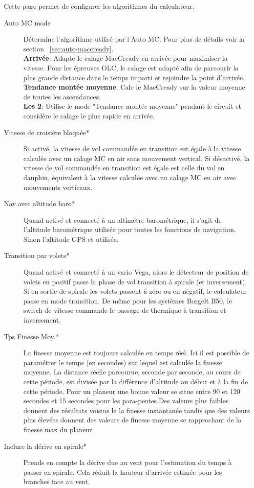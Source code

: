 Cette page permet de configurer les algorithmes du calculateur.

\begin{description}
\item[Auto MC mode]  Détermine l'algorithme utilisé par l'Auto MC. Pour plus de détails voir la section ~\ref{sec:auto-maccready}. \\  
  {\bf Arrivée}: Adapte le calage MacCready en arrivée pour maximiser la vitesse. Pour les épreuves OLC, le calage est adapté afin de parcourir la plus grande distance dans le temps imparti et rejoindre la point d'arrivée.\\
  {\bf Tendance montée moyenne}: Cale le MacCready sur la valeur moyenne de toutes les ascendances.\\
  {\bf Les 2}: Utilise le mode "Tendance montée moyenne" pendant le circuit et considère le calage le plus rapide en arrivée.
\item[Vitesse de croisière bloquée*]  Si activé, la vitesse de vol commandée en transition est égale à la vitesse calculée avec un calage MC en air sans mouvement vertical. Si désactivé, la vitesse de vol commandée en transition est égale est celle du vol en dauphin, équivalent à la vitesse calculée avec un calage MC en air avec mouvements verticaux.
\item[Nav.avec altitude baro*]  Quand activé et connecté à un altimètre barométrique, il s'agit de l'altitude barométrique utilisée pour toutes les fonctions de navigation. Sinon l'altitude GPS et utilisée.
\item[Transition par volets*]
Quand activé et connecté à un vario Vega, alors le détecteur de position de volets en positif passe la phase de vol transition à spirale (et inversement). Si en sortie de spirale les volets passent à zéro ou en négatif, le calculateur passe en mode transition. De même pour les systèmes Borgelt B50, le switch de vitesse commande le passage de thermique à transition et inversement.
\item[Tps Finesse Moy.*]  La finesse moyenne est toujours calculée en temps réel. Ici il est possible de paramétrer le temps (en secondes) sur lequel est calculée la finesse moyenne. La distance réelle parcourue, seconde par seconde, au cours de cette période, est divisée par la différence d'altitude au début et à la fin de cette période. Pour un planeur une bonne valeur se situe entre 90 et 120 secondes et 15 secondes pour les para-pentes.Des valeurs plus faibles donnent des résultats voisins le la finesse instantanée tandis que des valeurs plus élevées donnent des valeurs de finesse moyenne se rapprochant de la finesse max du planeur.
\item[Inclure la dérive en spirale*]  Prends en compte la dérive due au vent pour l'estimation du temps à passer en spirale. Cela réduit la hauteur d'arrivée estimée pour les branches face au vent.
\end{description}


